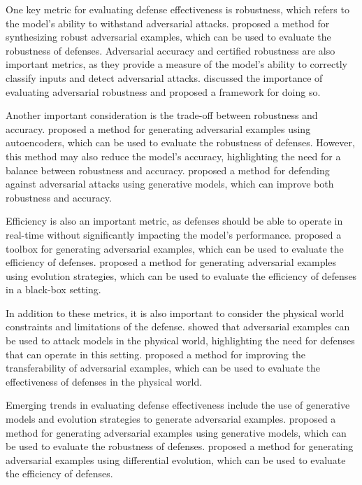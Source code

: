 \documentclass[11pt,a4paper]{article}
\begin{document}
One key metric for evaluating defense effectiveness is robustness, which refers to the model's ability to withstand adversarial attacks. \cite{arxiv:1707.07397} proposed a method for synthesizing robust adversarial examples, which can be used to evaluate the robustness of defenses. Adversarial accuracy and certified robustness are also important metrics, as they provide a measure of the model's ability to correctly classify inputs and detect adversarial attacks. \cite{arxiv:1902.06705} discussed the importance of evaluating adversarial robustness and proposed a framework for doing so.

Another important consideration is the trade-off between robustness and accuracy. \cite{arxiv:1511.05644} proposed a method for generating adversarial examples using autoencoders, which can be used to evaluate the robustness of defenses. However, this method may also reduce the model's accuracy, highlighting the need for a balance between robustness and accuracy. \cite{arxiv:1805.06605} proposed a method for defending against adversarial attacks using generative models, which can improve both robustness and accuracy.

Efficiency is also an important metric, as defenses should be able to operate in real-time without significantly impacting the model's performance. \cite{arxiv:2001.05574} proposed a toolbox for generating adversarial examples, which can be used to evaluate the efficiency of defenses. \cite{doi:10.1145/3449726.3463137} proposed a method for generating adversarial examples using evolution strategies, which can be used to evaluate the efficiency of defenses in a black-box setting.

In addition to these metrics, it is also important to consider the physical world constraints and limitations of the defense. \cite{doi:10.1201/9781351251389-8} showed that adversarial examples can be used to attack models in the physical world, highlighting the need for defenses that can operate in this setting. \cite{doi:10.1109/cvpr.2019.00284} proposed a method for improving the transferability of adversarial examples, which can be used to evaluate the effectiveness of defenses in the physical world.

Emerging trends in evaluating defense effectiveness include the use of generative models and evolution strategies to generate adversarial examples. \cite{doi:10.1109/access.2022.3160283} proposed a method for generating adversarial examples using generative models, which can be used to evaluate the robustness of defenses. \cite{doi:10.1186/s41074-019-0053-3} proposed a method for generating adversarial examples using differential evolution, which can be used to evaluate the efficiency of defenses.
\end{document}
